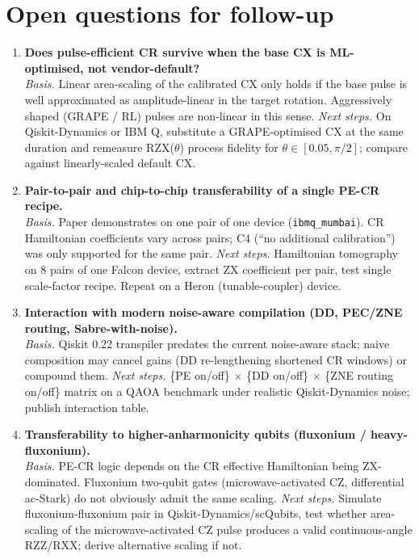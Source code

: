 \section{Open questions for follow-up}

\begin{enumerate}
  \item \textbf{Does pulse-efficient CR survive when the base CX is
    ML-optimised, not vendor-default?}\\
    \emph{Basis.} Linear area-scaling of the calibrated CX only
    holds if the base pulse is well approximated as
    amplitude-linear in the target rotation. Aggressively shaped
    (GRAPE / RL) pulses are non-linear in this sense.
    \emph{Next steps.} On Qiskit-Dynamics or IBM Q, substitute a
    GRAPE-optimised CX at the same duration and remeasure
    RZX($\theta$) process fidelity for $\theta\in[0.05,\pi/2]$;
    compare against linearly-scaled default CX.

  \item \textbf{Pair-to-pair and chip-to-chip transferability of a
    single PE-CR recipe.}\\
    \emph{Basis.} Paper demonstrates on one pair of one device
    (\texttt{ibmq\_mumbai}). CR Hamiltonian coefficients vary
    across pairs; C4 (``no additional calibration'') was only
    supported for the same pair.
    \emph{Next steps.} Hamiltonian tomography on 8 pairs of one
    Falcon device, extract ZX coefficient per pair, test single
    scale-factor recipe. Repeat on a Heron (tunable-coupler)
    device.

  \item \textbf{Interaction with modern noise-aware compilation
    (DD, PEC/ZNE routing, Sabre-with-noise).}\\
    \emph{Basis.} Qiskit 0.22 transpiler predates the current
    noise-aware stack; naive composition may cancel gains
    (DD re-lengthening shortened CR windows) or compound them.
    \emph{Next steps.} \{PE on/off\} $\times$ \{DD on/off\}
    $\times$ \{ZNE routing on/off\} matrix on a QAOA benchmark
    under realistic Qiskit-Dynamics noise; publish interaction
    table.

  \item \textbf{Transferability to higher-anharmonicity qubits
    (fluxonium / heavy-fluxonium).}\\
    \emph{Basis.} PE-CR logic depends on the CR effective
    Hamiltonian being ZX-dominated. Fluxonium two-qubit gates
    (microwave-activated CZ, differential ac-Stark) do not
    obviously admit the same scaling.
    \emph{Next steps.} Simulate fluxonium-fluxonium pair in
    Qiskit-Dynamics/scQubits, test whether area-scaling of the
    microwave-activated CZ pulse produces a valid continuous-angle
    RZZ/RXX; derive alternative scaling if not.


\end{enumerate}
